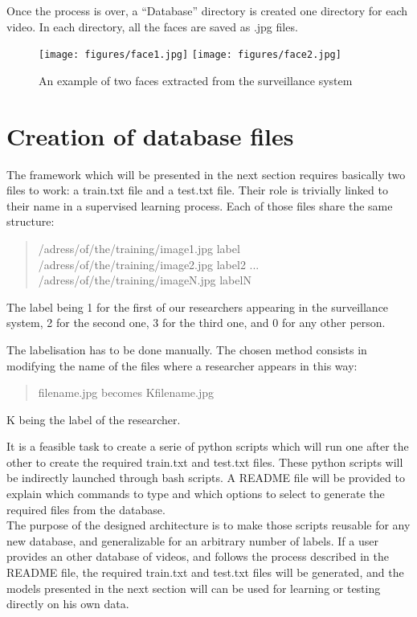 Once the process is over, a \enquote{Database} directory is created one directory for each video. In each directory, all the faces are saved as .jpg files.

\begin{figure}[!ht]
  \centering
  \texttt{[image: figures/face1.jpg]}
  \texttt{[image: figures/face2.jpg]}
  \caption[An example of two faces extracted from the surveillance system]{An example of two faces extracted from the surveillance system}
  \label{fig:face}
\end{figure}

\section{Creation of database files}

The framework which will be presented in the next section requires basically two files to work: a train.txt file and a test.txt file. Their role is trivially linked to their name in a supervised learning process. Each of those files share the same structure:

\blockquote{/adress/of/the/training/image1.jpg label\newline
/adress/of/the/training/image2.jpg label2\newline
...\newline
/adress/of/the/training/imageN.jpg labelN}

The label being 1 for the first of our researchers appearing in the surveillance system, 2 for the second one, 3 for the third one, and 0 for any other person.

The labelisation has to be done manually. The chosen method consists in modifying the name of the files where a researcher appears in this way:

\blockquote{filename.jpg becomes Kfilename.jpg}

K being the label of the researcher.

It is a feasible task to create a serie of python scripts which will run one after the other to create the required train.txt and test.txt files. These python scripts will be indirectly launched through bash scripts. A README file will be provided to explain which commands to type and which options to select to generate the required files from the database.\\

The purpose of the designed architecture is to make those scripts reusable for any new database, and generalizable for an arbitrary number of labels. If a user provides an other database of videos, and follows the process described in the README file, the required train.txt and test.txt files will be generated, and the models presented in the next section will can be used for learning or testing directly on his own data.

